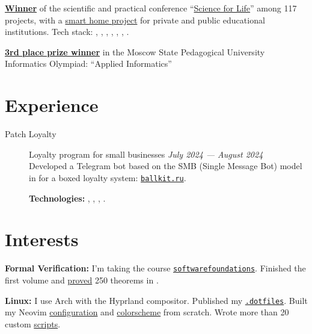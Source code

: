 \documentclass[margin,line]{resume}
\begin{document}
\begin{resume}
  \textbf{\href{https://alchemmist.github.io/CV/attachments/scince-for-life-win.pdf}{Winner}} of the scientific and practical conference
  “\href{https://conf.profil.mos.ru/academ}{Science for Life}” among 117 projects, with a
  \href{https://github.com/smart-cab/}{smart home project} for private and public educational institutions.
  Tech stack: ,
  , , ,
  , , .

  \textbf{\href{https://alchemmist.github.io/CV/attachments/informatics-olimpic.pdf}{3rd place prize winner}} in the Moscow State Pedagogical University Informatics Olympiad: “Applied Informatics”

  \vspace{-2mm}
  \section{\mysidestyle Experience}\vspace{2mm}

  \begin{description}

    \item[Patch Loyalty] Loyalty program for small businesses \hfill
      \textsl{July 2024 — August 2024\vspace{1mm}}\\
      Developed a Telegram bot based on the SMB (Single Message Bot) model in  for a boxed loyalty system:
      \href{https://ballkit.ru}{\texttt{ballkit.ru}}.

      \textbf{Technologies:}
      ,
      , ,
      .
  \end{description}
  \vspace{-4mm}
  \section{\mysidestyle Interests}\vspace{0.7mm}

  {\textbf{Formal Verification:} I'm taking the course
    \texttt{\href{https://softwarefoundations.cis.upenn.edu}{softwarefoundations}}.
    Finished the first volume and
    \href{https://github.com/alchemmist/coq-learning}{proved} 250 theorems in .} \\

  \vspace{-6mm}

  \textbf{Linux:} I use Arch with the Hyprland compositor. Published my
  \href{https:/github.com/alchemmist/.dotfiles}{\texttt{.dotfiles}}.
  Built my Neovim
  \href{https://github.com/alchemmist/.dotfiles/tree/main/nvim}{configuration} and
  \href{https://github.com/alchemmist/nothing.nvim}{colorscheme} from scratch.
  Wrote more than 20 custom
  \href{https://github.com/alchemmist/.dotfiles/tree/main/scripts}{scripts}.

\end{resume}
\end{document}
